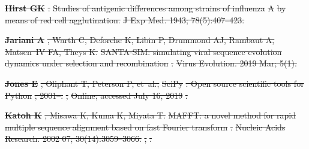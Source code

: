 \documentclass[9pt,lineno]{elife} %
\providecommand{\DIFdel}[1]{{\protect\color{red}\sout{#1}}}                      %
\providecommand{\DIFdeltex}[1]{{\protect\color{red}\sout{#1}}}                      %
\providecommand{\DIFdel}[1]{\texorpdfstring{\DIFdeltex{#1}}{}} %
\begin{document}
\textbf{%
\DIFdel{Hirst GK}}%
\DIFdel{.
}%
\DIFdel{Studies of antigenic differences among strains of influenza }%
\DIFdel{A}%
\DIFdel{by
  means of red cell agglutination.
}%
\DIFdel{J Exp Med.  1943; 78(5):407--423.
}%

\textbf{%
\DIFdel{Jariani A}}%
\DIFdel{, Warth C, Deforche K, Libin P,
  Drummond AJ, Rambaut A, Matsen~IV FA, Theys K.
}%
\DIFdel{SANTA-SIM: simulating viral sequence evolution dynamics under
  selection and recombination}%
\DIFdel{.
}%
\DIFdel{Virus Evolution.  2019 Mar; 5(1).
}%

\textbf{%
\DIFdel{Jones E}}%
\DIFdel{, Oliphant T, Peterson P, et~al.,
  }%
\DIFdel{SciPy}%
\DIFdel{: Open source scientific tools for }%
\DIFdel{Python}%
\DIFdel{; 2001--.
}%
\DIFdel{, }%
\DIFdel{Online; accessed July 16,
  2019}%
\DIFdel{.
}%

\textbf{%
\DIFdel{Katoh K}}%
\DIFdel{, Misawa K, Kuma K, Miyata T.
}%
\DIFdel{MAFFT: a novel method for rapid multiple sequence alignment based on
  fast Fourier transform}%
\DIFdel{.
}%
\DIFdel{Nucleic Acids Research.  2002 07; 30(14):3059--3066.
}%
\DIFdel{,
  }%
\DIFdel{.
}%
\end{document}
